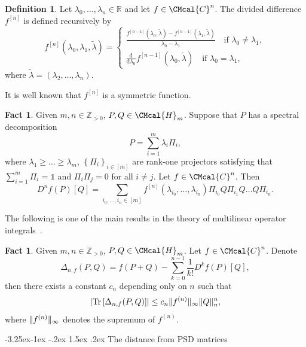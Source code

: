 \documentclass[11pt]{article}
\makeatletter
\renewcommand{\subsubsection}{\@startsection{subsubsection}{2}{\z@}%
             {-3.25ex\@plus -1ex \@minus -.2ex}%
             {1.5ex \@plus .2ex}%
             {\normalfont\normalsize\scshape\bfseries}}
\def\C{\CMcal{C}}
\def\H{\CMcal{H}}
\theoremstyle{plain}
\theoremstyle{definition}
\newtheorem{definition}[theorem]{Definition}
\newtheorem{fact}[theorem]{Fact}
\newcommand{\reals}{{\mathbb R}}
\newcommand {\set} [1] {\ensuremath{ \left\lbrace #1 \right\rbrace }}
\newcommand {\br} [1] {\ensuremath{ \left( #1 \right) }}
\newcommand {\Br} [1] {\ensuremath{ \left[ #1 \right] }}
\DeclarePairedDelimiter{\norm}{\lVert}{\rVert}
\newcommand {\ab} [1] {\ensuremath{ \left| #1 \right| }}
\newcommand {\Tr} {\ensuremath{ \mathrm{Tr} }}
\newcommand {\id} {\ensuremath{\mathds{1}}}
\newcommand{\posint}{{\mathbb Z}_{>0}}
\renewcommand{\d}{\mathrm{d}}
\newcommand{\1}{\mathbb{1}} %
\makeatother
\begin{document}
\begin{definition}
Let $\lambda_0,\dots,\lambda_n\in\reals$ and let $f\in\C^n$. The divided difference $f^{[n]}$ is defined recursively by
\[f^{[n]}(\lambda_0,\lambda_1,\tilde{\lambda})=\begin{cases}
\frac{f^{[n-1]}(\lambda_0,\tilde{\lambda})-f^{[n-1]}(\lambda_1,\tilde{\lambda})}{\lambda_0-\lambda_1}\quad\text{if }\lambda_0\ne\lambda_1,\\
\frac{\d}{\d\lambda_0}f^{[n-1]}(\lambda_0,\tilde{\lambda})\quad\text{if }\lambda_0=\lambda_1,
\end{cases}\]
where $\tilde{\lambda}=(\lambda_2,\dots,\lambda_n)$.
\end{definition}

It is well known that $f^{[n]}$ is a symmetric function.


	
\begin{fact}
 \cite[Theorem 5.3.2]{skripka2019multilinear}
 \cite[Theorem 6.1]{SENDOV2007240}\label{fac:frechetD}
Given $m,n\in\posint$, $P,Q\in\H_m$. Suppose that $P$ has a spectral decomposition
\begin{equation}\label{eqn:specdecom}
P=\sum_{i=1}^{m}\lambda_i\Pi_i,
\end{equation}
where $\lambda_1\geq\dots\geq\lambda_{m}$, $\set{\Pi_i}_{i\in[{m}]}$ are rank-one projectors satisfying that $\sum_{i=1}^{m}\Pi_i=\id$ and $\Pi_i\Pi_j=0$ for all $i\ne j$. Let $f\in\C^{n}$. Then
\[D^nf(P)\Br{Q}=\sum_{i_0,\dots,i_n\in[m]}f^{[n]}\br{\lambda_{i_0},\dots,\lambda_{i_n}}\Pi_{i_0}Q\Pi_{i_1}Q\dots Q\Pi_{i_n}.\]
\end{fact}

The following is one of the main results in the theory of multilinear operator integrals~\cite{skripka2019multilinear}. 
\begin{fact}\label{fact:remainder} \cite[Theorem 5.3.12]{skripka2019multilinear}
Given $m,n\in\posint$, $P,Q\in\H_m$. Let $f\in\C^{n}$. Denote
\[\Delta_{n,f}(P,Q)=f(P+Q)-\sum_{k=0}^{n-1}\frac{1}{k!}D^kf(P)\Br{Q},\]
then there exists a constant $c_n$ depending only on $n$ such that 
\[\ab{\Tr\Br{\Delta_{n,f}(P,Q)}}\leq c_n\norm{f^{(n)}}_\infty\norm{Q}_n^n,\]
where $\norm{f^{(n)}}_\infty$ denotes the supremum of $f^{(n)}$.
\end{fact}

\subsubsection{The distance from PSD matrices}
\end{document}
